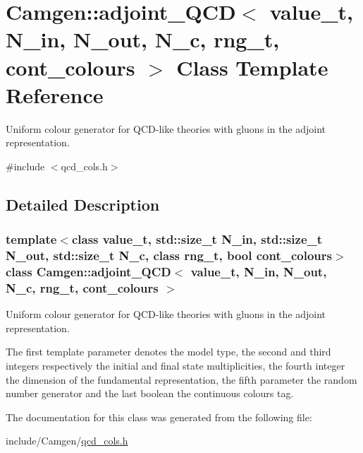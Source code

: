 \hypertarget{a00003}{}\section{Camgen\+:\+:adjoint\+\_\+\+Q\+C\+D$<$ value\+\_\+t, N\+\_\+in, N\+\_\+out, N\+\_\+c, rng\+\_\+t, cont\+\_\+colours $>$ Class Template Reference}
\label{a00003}


Uniform colour generator for Q\+C\+D-\/like theories with gluons in the adjoint representation.  




{\ttfamily \#include $<$qcd\+\_\+cols.\+h$>$}



\subsection{Detailed Description}
\subsubsection*{template$<$class value\+\_\+t, std\+::size\+\_\+t N\+\_\+in, std\+::size\+\_\+t N\+\_\+out, std\+::size\+\_\+t N\+\_\+c, class rng\+\_\+t, bool cont\+\_\+colours$>$class Camgen\+::adjoint\+\_\+\+Q\+C\+D$<$ value\+\_\+t, N\+\_\+in, N\+\_\+out, N\+\_\+c, rng\+\_\+t, cont\+\_\+colours $>$}

Uniform colour generator for Q\+C\+D-\/like theories with gluons in the adjoint representation. 

The first template parameter denotes the model type, the second and third integers respectively the initial and final state multiplicities, the fourth integer the dimension of the fundamental representation, the fifth parameter the random number generator and the last boolean the continuous colours tag. 

The documentation for this class was generated from the following file\+:\begin{DoxyCompactItemize}
\item 
include/\+Camgen/\hyperlink{a00752}{qcd\+\_\+cols.\+h}\end{DoxyCompactItemize}
